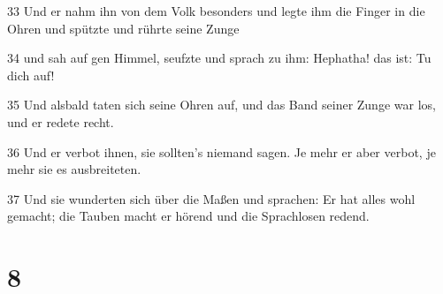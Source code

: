 \par 33 Und er nahm ihn von dem Volk besonders und legte ihm die Finger in die Ohren und spützte und rührte seine Zunge
\par 34 und sah auf gen Himmel, seufzte und sprach zu ihm: Hephatha! das ist: Tu dich auf!
\par 35 Und alsbald taten sich seine Ohren auf, und das Band seiner Zunge war los, und er redete recht.
\par 36 Und er verbot ihnen, sie sollten's niemand sagen. Je mehr er aber verbot, je mehr sie es ausbreiteten.
\par 37 Und sie wunderten sich über die Maßen und sprachen: Er hat alles wohl gemacht; die Tauben macht er hörend und die Sprachlosen redend.

\chapter{8}

